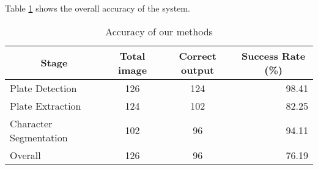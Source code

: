 Table \ref{tab:Accuracy1} shows the overall accuracy of the system.

\begin{table}[htb]
\centering
\begin{tabular}{|l|c|c|r|}
    \hline 
    \multicolumn{1}{|c|}{Stage} & 
    \multicolumn{1}{|c|}{Total image} &
    \multicolumn{1}{|c|}{Correct output} &
    \multicolumn{1}{|c|}{Success Rate (\%)} \\
    \hline 
    Plate Detection & 126 & 124 & 98.41 \\ 
    Plate Extraction & 124 & 102 & 82.25 \\ 
    Character Segmentation & 102 & 96 & 94.11 \\
    \hline
    Overall & 126 & 96 & 76.19 \\
    \hline
\end{tabular}
\caption{Accuracy of our methods}
\label{tab:Accuracy1}
\end{table}

